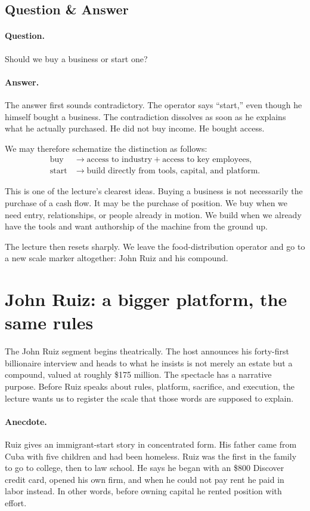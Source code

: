 \subsection{Question \& Answer}

\paragraph{Question.}
Should we buy a business or start one?

\paragraph{Answer.}
The answer first sounds contradictory. The operator says ``start,'' even though he himself bought a business. The contradiction dissolves as soon as he explains what he actually purchased. He did not buy income. He bought access.

We may therefore schematize the distinction as follows:
\begin{align}
\text{buy} &\longrightarrow \text{access to industry} + \text{access to key employees},\\
\text{start} &\longrightarrow \text{build directly from tools, capital, and platform}.
\end{align}

This is one of the lecture's clearest ideas. Buying a business is not necessarily the purchase of a cash flow. It may be the purchase of position. We buy when we need entry, relationships, or people already in motion. We build when we already have the tools and want authorship of the machine from the ground up.

The lecture then resets sharply. We leave the food-distribution operator and go to a new scale marker altogether: John Ruiz and his compound.

\section{John Ruiz: a bigger platform, the same rules}

The John Ruiz segment begins theatrically. The host announces his forty-first billionaire interview and heads to what he insists is not merely an estate but a compound, valued at roughly \$175 million. The spectacle has a narrative purpose. Before Ruiz speaks about rules, platform, sacrifice, and execution, the lecture wants us to register the scale that those words are supposed to explain.

\paragraph{Anecdote.}
Ruiz gives an immigrant-start story in concentrated form. His father came from Cuba with five children and had been homeless. Ruiz was the first in the family to go to college, then to law school. He says he began with an \$800 Discover credit card, opened his own firm, and when he could not pay rent he paid in labor instead. In other words, before owning capital he rented position with effort.

